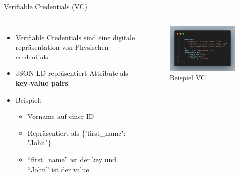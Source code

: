 \documentclass[
	german,%
	authorontitle=true,
	]{bfhbeamer}
\begin{document}
\begin{frame}{Verifiable Credentials (VC)}
    \begin{columns}[onlytextwidth,T]
        \column{70mm}  

    \begin{itemize}
        \item Verifiable Credentials sind eine digitale repräsentation von Physischen credentials
        \item JSON-LD repräsentiert Attribute als \textbf{key-value pairs}
        \item Beispiel:
        \begin{itemize}
            \item Vorname auf einer ID
            \item Repräsentiert als \{"first\_name": "John"\}
            \item ``first\_name'' ist der key und ``John'' ist der value
        \end{itemize}
    \end{itemize}

    \column{70mm}
    \begin{figure}
        \centering
        \includegraphics[width=70mm]{../img/VCexp.png}
        \caption{Beispiel VC}
    \end{figure}

    \end{columns}
\end{frame}
\end{document}
